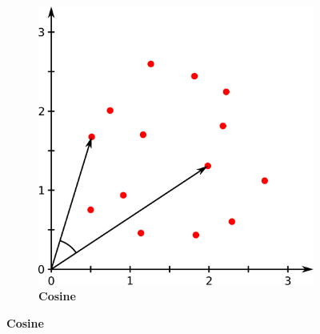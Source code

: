 \begin{figure}
\begin{adjustbox}{minipage=\dimexpr{}\fboxrule,fbox}
\begin{subfigure}[b]{0.45\textwidth}
            \includegraphics[width=\textwidth]{Extra_Graphics/Cosinus.pdf}
            \caption[Cosine]{\textbf{Cosine}}
            \label{fig:1.0.2b}
        \end{subfigure}
    \end{adjustbox}
\end{figure}

